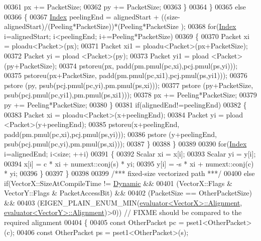 \begin{DoxyCode}
00361         px += PacketSize;
00362         py += PacketSize;
00363       \}
00364     \}
00365     \textcolor{keywordflow}{else}
00366     \{
00367       \hyperlink{namespace_eigen_a62e77e0933482dafde8fe197d9a2cfde}{Index} peelingEnd = alignedStart + ((size-alignedStart)/(Peeling*PacketSize))*(Peeling*PacketSize
      );
00368       \textcolor{keywordflow}{for}(\hyperlink{namespace_eigen_a62e77e0933482dafde8fe197d9a2cfde}{Index} i=alignedStart; i<peelingEnd; i+=Peeling*PacketSize)
00369       \{
00370         Packet xi   = ploadu<Packet>(px);
00371         Packet xi1  = ploadu<Packet>(px+PacketSize);
00372         Packet yi   = pload <Packet>(py);
00373         Packet yi1  = pload <Packet>(py+PacketSize);
00374         pstoreu(px, padd(pm.pmul(pc,xi),pcj.pmul(ps,yi)));
00375         pstoreu(px+PacketSize, padd(pm.pmul(pc,xi1),pcj.pmul(ps,yi1)));
00376         pstore (py, psub(pcj.pmul(pc,yi),pm.pmul(ps,xi)));
00377         pstore (py+PacketSize, psub(pcj.pmul(pc,yi1),pm.pmul(ps,xi1)));
00378         px += Peeling*PacketSize;
00379         py += Peeling*PacketSize;
00380       \}
00381       \textcolor{keywordflow}{if}(alignedEnd!=peelingEnd)
00382       \{
00383         Packet xi = ploadu<Packet>(x+peelingEnd);
00384         Packet yi = pload <Packet>(y+peelingEnd);
00385         pstoreu(x+peelingEnd, padd(pm.pmul(pc,xi),pcj.pmul(ps,yi)));
00386         pstore (y+peelingEnd, psub(pcj.pmul(pc,yi),pm.pmul(ps,xi)));
00387       \}
00388     \}
00389 
00390     \textcolor{keywordflow}{for}(\hyperlink{namespace_eigen_a62e77e0933482dafde8fe197d9a2cfde}{Index} i=alignedEnd; i<size; ++i)
00391     \{
00392       Scalar xi = x[i];
00393       Scalar yi = y[i];
00394       x[i] =  c * xi + numext::conj(s) * yi;
00395       y[i] = -s * xi + numext::conj(c) * yi;
00396     \}
00397   \}
00398 
00399   \textcolor{comment}{/*** fixed-size vectorized path ***/}
00400   \textcolor{keywordflow}{else} \textcolor{keywordflow}{if}(VectorX::SizeAtCompileTime != \hyperlink{namespace_eigen_ad81fa7195215a0ce30017dfac309f0b2}{Dynamic} &&
00401           (VectorX::Flags & VectorY::Flags & PacketAccessBit) &&
00402           (PacketSize == OtherPacketSize) &&
00403           (EIGEN\_PLAIN\_ENUM\_MIN(\hyperlink{struct_eigen_1_1internal_1_1evaluator}{evaluator<VectorX>::Alignment}, 
      \hyperlink{struct_eigen_1_1internal_1_1evaluator}{evaluator<VectorY>::Alignment})>0)) \textcolor{comment}{// FIXME should be compared to the required
       alignment}
00404   \{
00405     \textcolor{keyword}{const} OtherPacket pc = pset1<OtherPacket>(c);
00406     \textcolor{keyword}{const} OtherPacket ps = pset1<OtherPacket>(s);

\end{DoxyCode}
